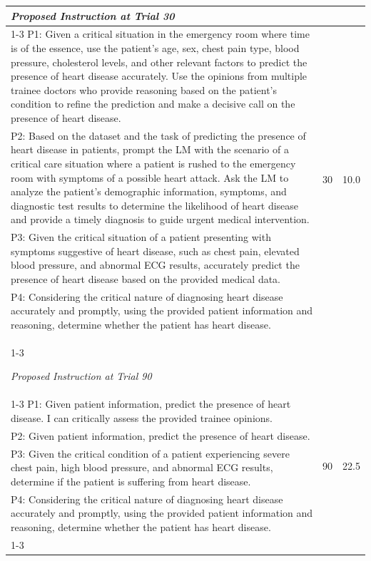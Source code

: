 \begin{table}[ht]
\begin{tabularx}{\textwidth}{Xcc}
\textit{Proposed Instruction at Trial 30} \\
\cline{1-3}
P1: Given a critical situation in the emergency room where time is of the essence, use the patient's age, sex, chest pain type, blood pressure, cholesterol levels, and other relevant factors to predict the presence of heart disease accurately. Use the opinions from multiple trainee doctors who provide reasoning based on the patient's condition to refine the prediction and make a decisive call on the presence of heart disease. & \multirow{4}{*}{30} & \multirow{4}{*}{10.0} \\
P2: Based on the dataset and the task of predicting the presence of heart disease in patients, prompt the LM with the scenario of a critical care situation where a patient is rushed to the emergency room with symptoms of a possible heart attack. Ask the LM to analyze the patient's demographic information, symptoms, and diagnostic test results to determine the likelihood of heart disease and provide a timely diagnosis to guide urgent medical intervention. & & \\
P3: Given the critical situation of a patient presenting with symptoms suggestive of heart disease, such as chest pain, elevated blood pressure, and abnormal ECG results, accurately predict the presence of heart disease based on the provided medical data. & & \\
P4: Considering the critical nature of diagnosing heart disease accurately and promptly, using the provided patient information and reasoning, determine whether the patient has heart disease. & & \\
\cline{1-3}

\textit{Proposed Instruction at Trial 90} \\
\cline{1-3}
P1: Given patient information, predict the presence of heart disease. I can critically assess the provided trainee opinions. & \multirow{4}{*}{90} & \multirow{4}{*}{22.5} \\
P2: Given patient information, predict the presence of heart disease. & & \\
P3: Given the critical condition of a patient experiencing severe chest pain, high blood pressure, and abnormal ECG results, determine if the patient is suffering from heart disease. & & \\
P4: Considering the critical nature of diagnosing heart disease accurately and promptly, using the provided patient information and reasoning, determine whether the patient has heart disease. & & \\
\cline{1-3}


\end{tabularx}
\end{table}
